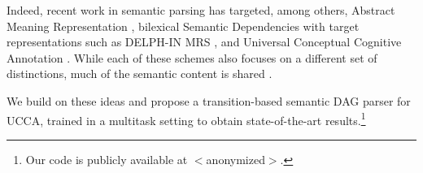 \documentclass[11pt,a4paper]{article}
\begin{document}
Indeed, recent work in semantic parsing has targeted, among others,
Abstract Meaning Representation \cite[AMR;][]{banarescu2013abstract,damonte-17,11099},
bilexical Semantic Dependencies \cite[SDP;][]{oepen2014semeval,oepen2015semeval,oepen2016towards,P17-1186}
with target representations such as DELPH-IN MRS \cite[DM;][]{flickinger2012deepbank},
and Universal Conceptual Cognitive Annotation \cite[UCCA;][]{abend2013universal,hershcovich2017a}.
While each of these schemes also focuses on a different set of distinctions,
much of the semantic content is shared \cite{abend2017state}.



We build on these ideas and propose a transition-based semantic DAG parser for UCCA,
trained in a multitask setting to obtain state-of-the-art 
results.\footnote{Our code is publicly available at $<$anonymized$>$.}
\end{document}

